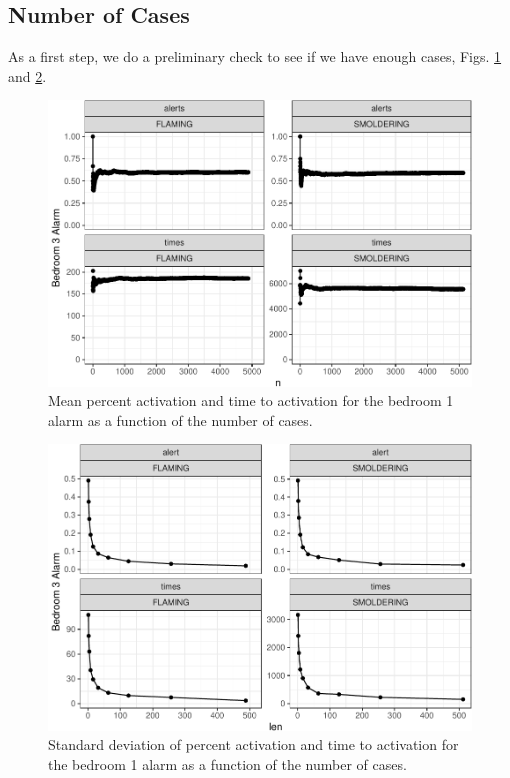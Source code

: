\documentclass[12pt,twoside]{book}
\begin{document}
\hypertarget{number-of-cases}{%
\subsection{Number of Cases}\label{number-of-cases}}

As a first step, we do a preliminary check to see if we have enough cases, Figs. \ref{Ex_3-convergence_of_mean} and \ref{Ex_3-standard_error}.

\begin{figure}[h!]
\centering
\includegraphics[width=4.5in]{FIGURES/converg-1.pdf}
\caption{Mean percent activation and time to activation for the bedroom 1 alarm as a function of the number of cases.}
\label{Ex_3-convergence_of_mean}
\end{figure}
\begin{figure}[h!]
\centering
\includegraphics[width=4.5in]{FIGURES/converg-2.pdf}
\caption{Standard deviation of percent activation and time to activation for the bedroom 1 alarm as a function of the number of cases.}
\label{Ex_3-standard_error}
\end{figure}
\end{document}
